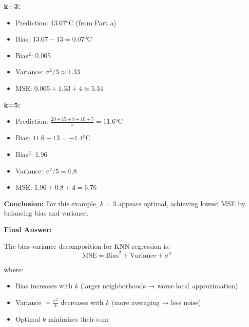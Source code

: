 \documentclass[12pt]{article}
\begin{document}
\begin{solution}
\textbf{k=3:}
\begin{itemize}
    \item Prediction: 13.07°C (from Part a)
    \item Bias: \(13.07 - 13 = 0.07°\)C
    \item Bias\(^2\): 0.005
    \item Variance: \(\sigma^2/3 \approx 1.33\)
    \item MSE: \(0.005 + 1.33 + 4 \approx 5.34\)
\end{itemize}

\textbf{k=5:}
\begin{itemize}
    \item Prediction: \(\frac{20+15+8+10+5}{5} = 11.6°\)C
    \item Bias: \(11.6 - 13 = -1.4°\)C
    \item Bias\(^2\): 1.96
    \item Variance: \(\sigma^2/5 = 0.8\)
    \item MSE: \(1.96 + 0.8 + 4 = 6.76\)
\end{itemize}

\textbf{Conclusion:} For this example, \(k=3\) appears optimal, achieving lowest MSE by balancing bias and variance.

\textbf{Final Answer:}

The bias-variance decomposition for KNN regression is:
\[
\boxed{\text{MSE} = \text{Bias}^2 + \text{Variance} + \sigma^2}
\]

where:
\begin{itemize}
    \item Bias increases with \(k\) (larger neighborhoods → worse local approximation)
    \item Variance \(= \frac{\sigma^2}{k}\) decreases with \(k\) (more averaging → less noise)
    \item Optimal \(k\) minimizes their sum
\end{itemize}
\end{solution}
\end{document}
